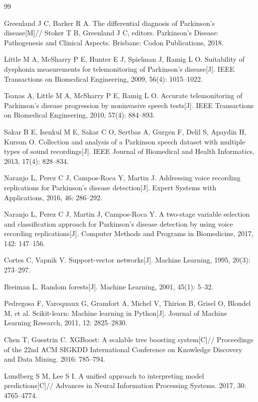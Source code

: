 \begin{thebibliography}{99}

Greenland J C, Barker R A. The differential diagnosis of Parkinson's disease[M]// Stoker T B, Greenland J C, editors. Parkinson's Disease: Pathogenesis and Clinical Aspects. Brisbane: Codon Publications, 2018.

Little M A, McSharry P E, Hunter E J, Spielman J, Ramig L O. Suitability of dysphonia measurements for telemonitoring of Parkinson's disease[J]. IEEE Transactions on Biomedical Engineering, 2009, 56(4): 1015--1022.

Tsanas A, Little M A, McSharry P E, Ramig L O. Accurate telemonitoring of Parkinson's disease progression by noninvasive speech tests[J]. IEEE Transactions on Biomedical Engineering, 2010, 57(4): 884--893.

Sakar B E, Isenkul M E, Sakar C O, Sertbas A, Gurgen F, Delil S, Apaydin H, Kursun O. Collection and analysis of a Parkinson speech dataset with multiple types of sound recordings[J]. IEEE Journal of Biomedical and Health Informatics, 2013, 17(4): 828--834.

Naranjo L, Perez C J, Campos-Roca Y, Martin J. Addressing voice recording replications for Parkinson's disease detection[J]. Expert Systems with Applications, 2016, 46: 286--292.

Naranjo L, Perez C J, Martin J, Campos-Roca Y. A two-stage variable selection and classification approach for Parkinson's disease detection by using voice recording replications[J]. Computer Methods and Programs in Biomedicine, 2017, 142: 147--156.

Cortes C, Vapnik V. Support-vector networks[J]. Machine Learning, 1995, 20(3): 273--297.

Breiman L. Random forests[J]. Machine Learning, 2001, 45(1): 5--32.

Pedregosa F, Varoquaux G, Gramfort A, Michel V, Thirion B, Grisel O, Blondel M, et al. Scikit-learn: Machine learning in Python[J]. Journal of Machine Learning Research, 2011, 12: 2825--2830.

Chen T, Guestrin C. XGBoost: A scalable tree boosting system[C]// Proceedings of the 22nd ACM SIGKDD International Conference on Knowledge Discovery and Data Mining. 2016: 785--794.

Lundberg S M, Lee S I. A unified approach to interpreting model predictions[C]// Advances in Neural Information Processing Systems. 2017, 30: 4765--4774.


\end{thebibliography}
